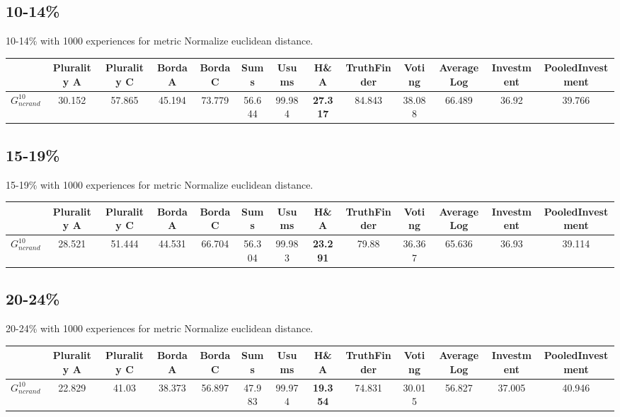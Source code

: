 \documentclass{article}
\newcommand{\graph}[2]{$G_{#1}^{#2}$}
\begin{document}
\newpage

\subsection{10-14\%}

10-14\% with 1000 experiences for metric Normalize euclidean distance.

\noindent\begin{tabular}{|l|c|c|c|c|c|c|c|c|c|c|c|c|}
\hline
& Plurality A& Plurality C& Borda A& Borda C& Sums& Usums& H\&A& TruthFinder& Voting& AverageLog& Investment& PooledInvestment\\
\hline
\graph{ncrand}{10} &30.152&57.865&45.194&73.779&56.644&99.984&\textbf{27.317}&84.843&38.088&66.489&36.92&39.766\\
\hline
\end{tabular}
\newpage

\subsection{15-19\%}

15-19\% with 1000 experiences for metric Normalize euclidean distance.

\noindent\begin{tabular}{|l|c|c|c|c|c|c|c|c|c|c|c|c|}
\hline
& Plurality A& Plurality C& Borda A& Borda C& Sums& Usums& H\&A& TruthFinder& Voting& AverageLog& Investment& PooledInvestment\\
\hline
\graph{ncrand}{10} &28.521&51.444&44.531&66.704&56.304&99.983&\textbf{23.291}&79.88&36.367&65.636&36.93&39.114\\
\hline
\end{tabular}
\newpage

\subsection{20-24\%}

20-24\% with 1000 experiences for metric Normalize euclidean distance.

\noindent\begin{tabular}{|l|c|c|c|c|c|c|c|c|c|c|c|c|}
\hline
& Plurality A& Plurality C& Borda A& Borda C& Sums& Usums& H\&A& TruthFinder& Voting& AverageLog& Investment& PooledInvestment\\
\hline
\graph{ncrand}{10} &22.829&41.03&38.373&56.897&47.983&99.974&\textbf{19.354}&74.831&30.015&56.827&37.005&40.946\\
\hline
\end{tabular}
\newpage
\end{document}
